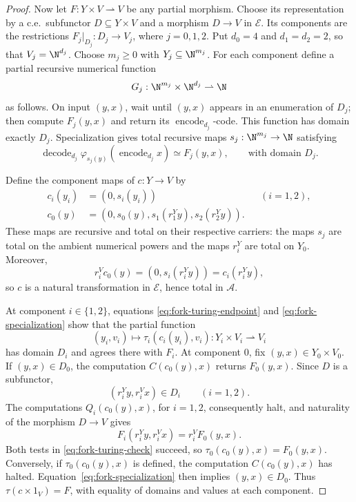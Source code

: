 \begin{proof}
Now let $F:Y\times V\rightharpoonup V$ be any partial morphism.
Choose its representation by a c.e.\ subfunctor
$D\subseteq Y\times V$ and a morphism $D\to V$ in
$\mathcal E$. Its components are the restrictions
$F_j|_{D_j}:D_j\to V_j$, where $j=0,1,2$.
Put $d_0=4$ and $d_1=d_2=2$, so that $V_j=\N^{d_j}$.
Choose $m_j\geq0$ with $Y_j\subseteq\N^{m_j}$.
For each component define a partial recursive numerical function
\[
 G_j:\N^{m_j}\times\N^{d_j}\rightharpoonup\N
\]
as follows. On input $(y,x)$, wait until $(y,x)$ appears in an
enumeration of $D_j$; then compute $F_j(y,x)$ and return its
$\operatorname{encode}_{d_j}$-code. This function has domain
exactly $D_j$.
Specialization gives total recursive maps
$s_j:\N^{m_j}\to\N$ satisfying
\begin{equation}\label{eq:fork-specialization}
 \operatorname{decode}_{d_j}
   \varphi_{s_j(y)}(\operatorname{encode}_{d_j}x)
 \simeq F_j(y,x),
 \qquad\text{with domain }D_j.
\end{equation}

Define the component maps of $c:Y\to V$ by
\begin{align*}
 c_i(y_i)&=(0,s_i(y_i)) &&(i=1,2),\\
 c_0(y)&=(0,s_0(y),s_1(r_1^Yy),s_2(r_2^Yy)).
\end{align*}
These maps are recursive and total on their respective carriers:
the maps $s_j$ are total on the ambient numerical powers and the
maps $r_i^Y$ are total on $Y_0$. Moreover,
\[
 r_i^Vc_0(y)=(0,s_i(r_i^Yy))=c_i(r_i^Yy),
\]
so $c$ is a natural transformation in $\mathcal E$, hence total in
$\mathcal A$.

At component $i\in\{1,2\}$, equations
\eqref{eq:fork-turing-endpoint} and
\eqref{eq:fork-specialization} show that the partial function
\[
 (y_i,v_i)\longmapsto\tau_i(c_i(y_i),v_i)
 :Y_i\times V_i\rightharpoonup V_i
\]
has domain $D_i$ and agrees there with $F_i$.
At component $0$, fix $(y,x)\in Y_0\times V_0$.
If $(y,x)\in D_0$, the computation $C(c_0(y),x)$ returns $F_0(y,x)$.
Since $D$ is a subfunctor,
\[
 (r_i^Yy,r_i^Vx)\in D_i\qquad(i=1,2).
\]
The computations $Q_i(c_0(y),x)$, for $i=1,2$, consequently
halt, and naturality of the morphism $D\to V$ gives
\[
 F_i(r_i^Yy,r_i^Vx)=r_i^VF_0(y,x).
\]
Both tests in \eqref{eq:fork-turing-check} succeed, so
$\tau_0(c_0(y),x)=F_0(y,x)$.
Conversely, if $\tau_0(c_0(y),x)$ is defined, the computation
$C(c_0(y),x)$ has halted. Equation~\eqref{eq:fork-specialization}
then implies $(y,x)\in D_0$.
Thus $\tau(c\times1_V)=F$, with equality of domains and values
at each component.
\end{proof}

